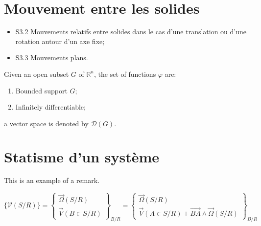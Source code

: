 \documentclass[
	11pt, %
	fleqn, %
	a4paper, %
]{LegrandOrangeBook}
\begin{document}

\section{Mouvement entre les solides}
\begin{corollary}[S3] 
\begin{itemize}
    \item S3.2 Mouvements relatifs entre solides dans le cas d'une translation ou d'une rotation autour d'un axe fixe;
    \item S3.3 Mouvements plans.
\end{itemize}

\end{corollary}



\begin{notation} %
	Given an open subset $G$ of $\mathbb{R}^n$, the set of functions $\varphi$ are:
	\begin{enumerate}
		\item Bounded support $G$;
		\item Infinitely differentiable;
	\end{enumerate}
	a vector space is denoted by $\mathcal{D}(G)$. 
\end{notation}


\section{Statisme d'un système}

This is an example of a remark.

$\{ \mathcal{V} (S/R) \}
= \left\{ \begin{array}{c}
     \overrightarrow{\Omega} (S/R) \\
     \overrightarrow{V} (B \in S/R)
\end{array} \right\} _{B/R}
= \left\{ \begin{array}{c}
     \overrightarrow{\Omega} (S/R) \\
     \overrightarrow{V} (A \in S/R) +\overrightarrow{BA} \wedge \overrightarrow{\Omega}(S/R)
\end{array} \right\} _{B/R}$
\end{document}
